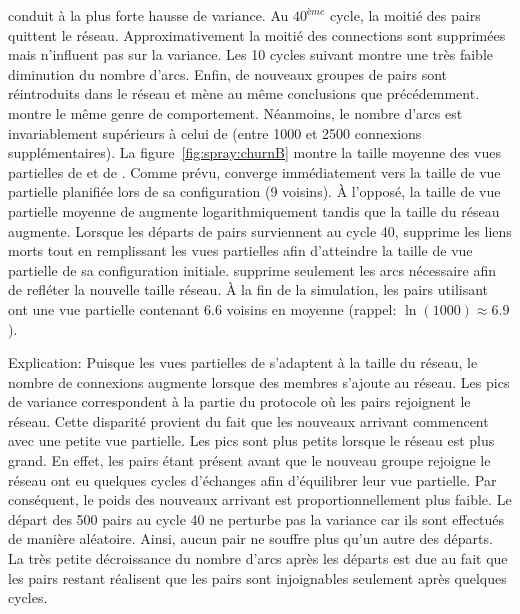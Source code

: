 \begin{asparadesc}
  conduit à la plus forte hausse de variance. Au $40^{ème}$ cycle, la moitié des
  pairs quittent le réseau. Approximativement la moitié des connections sont
  supprimées mais n'influent pas sur la variance. Les 10 cycles suivant montre
  une très faible diminution du nombre d'arcs. Enfin, de nouveaux groupes de
  pairs sont réintroduits dans le réseau et mène au même conclusions que
  précédemment. \CYCLON montre le même genre de comportement. Néanmoins, le
  nombre d'arcs est invariablement supérieurs à celui de \SPRAY (entre 1000 et
  2500 connexions supplémentaires). La figure~\ref{fig:spray:churnB} montre la
  taille moyenne des vues partielles de \SPRAY et de \CYCLON. Comme prévu,
  \CYCLON converge immédiatement vers la taille de vue partielle planifiée lors
  de sa configuration (9 voisins). À l'opposé, la taille de vue partielle
  moyenne de \SPRAY augmente logarithmiquement tandis que la taille du réseau
  augmente. Lorsque les départs de pairs surviennent au cycle 40, \CYCLON
  supprime les liens morts tout en remplissant les vues partielles afin
  d'atteindre la taille de vue partielle de sa configuration initiale. \SPRAY
  supprime seulement les arcs nécessaire afin de refléter la nouvelle taille
  réseau. À la fin de la simulation, les pairs utilisant \SPRAY ont une vue
  partielle contenant 6.6 voisins en moyenne (rappel: $\ln(1000)\approx 6.9$).
\item [Explication:] Puisque les vues partielles de \SPRAY s'adaptent à la
  taille du réseau, le nombre de connexions augmente lorsque des membres
  s'ajoute au réseau. Les pics de variance correspondent à la partie du
  protocole où les pairs rejoignent le réseau. Cette disparité provient du fait
  que les nouveaux arrivant commencent avec une petite vue partielle. Les pics
  sont plus petits lorsque le réseau est plus grand. En effet, les pairs étant
  présent avant que le nouveau groupe rejoigne le réseau ont eu quelques cycles
  d'échanges afin d'équilibrer leur vue partielle. Par conséquent, le poids des
  nouveaux arrivant est proportionnellement plus faible. Le départ des 500 pairs
  au cycle 40 ne perturbe pas la variance car ils sont effectués de manière
  aléatoire. Ainsi, aucun pair ne souffre plus qu'un autre des départs. La très
  petite décroissance du nombre d'arcs après les départs est due au fait que les
  pairs restant réalisent que les pairs sont injoignables seulement après
  quelques cycles. 
\end{asparadesc}


